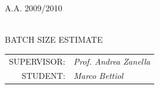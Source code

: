 \begin{titlepage}
		\vskip1.2cm\begin{center}
      \rm\large\uppercase\expandafter{A.A. 2009/2010\\}
 \end{center}
    	
    \vskip 2.5cm\begin{center}
    \HRule \\[0.4cm]\LARGE\expandafter{BATCH SIZE ESTIMATE}
    \HRule \\[0.4cm]
    \end{center}
    
    \begin{flushright}\vskip4.0cm 
    \begin{tabular}{rl}
            \rm\large \uppercase{Supervisor:} &\emph{Prof. Andrea Zanella}\\
	   \rm\large \uppercase{Student:} &\emph{Marco Bettiol} \\
		\end{tabular}
     \end{flushright}
    \vfill
    
\end{titlepage}


\newpage

